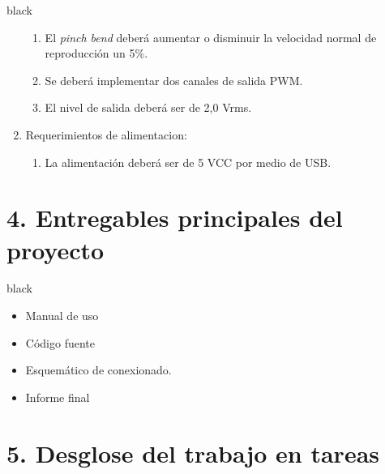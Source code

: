 \documentclass[11pt]{charter}
\begin{document}
\begin{consigna}{black}
\begin{enumerate}
\begin{enumerate}
	\item El \textit{pinch bend} deberá aumentar o disminuir la velocidad normal de reproducción un 5\%.
	\item Se deberá implementar dos canales de salida PWM.
	\item El nivel de salida deberá ser de 2,0 Vrms.
	\end{enumerate}
\item Requerimientos de alimentacion:
	\begin{enumerate}
	\item La alimentación deberá ser de 5 VCC por medio de USB.
	\end{enumerate}
\end{enumerate}
\end{consigna}

\section{4. Entregables principales del proyecto}
\label{sec:entregables}

\begin{consigna}{black}
\begin{itemize}
\item Manual de uso
\item Código fuente
\item Esquemático de conexionado.
\item Informe final

\end{itemize}

\end{consigna}

\section{5. Desglose del trabajo en tareas}
\label{sec:wbs}
\end{document}
